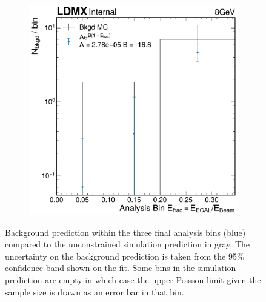 \begin{figure}
\begin{subfigure}{0.48\textwidth}
    \includegraphics[width=\textwidth]{figures/ldmx/analysis/8gev-integrated-bkgd-fit.pdf}
  \end{subfigure}
  \caption{%
    Background prediction within the three final analysis bins (blue)
    compared to the unconstrained simulation prediction in gray.
    The uncertainty on the background prediction is taken from the 95\% confidence band
    shown on the fit.
    Some bins in the simulation prediction are empty in which case the upper Poisson limit
    given the sample size is drawn as an error bar in that bin.
  }
  \label{fig:bkgd-pred}
\end{figure}

